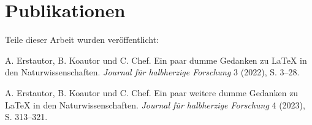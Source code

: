 \chapter*{Publikationen}

Teile dieser Arbeit wurden veröffentlicht:

\begin{list}{}{\setlength\leftmargin{0ex}}
\item A. Erstautor, B. Koautor und C. Chef. Ein paar dumme Gedanken zu \LaTeX{} in den Naturwissenschaften. \emph{Journal für halbherzige Forschung} 3 (2022), S. 3--28.

\item A. Erstautor, B. Koautor und C. Chef. Ein paar weitere dumme Gedanken zu \LaTeX{} in den Naturwissenschaften. \emph{Journal für halbherzige Forschung} 4 (2023), S. 313--321.
\end{list}
